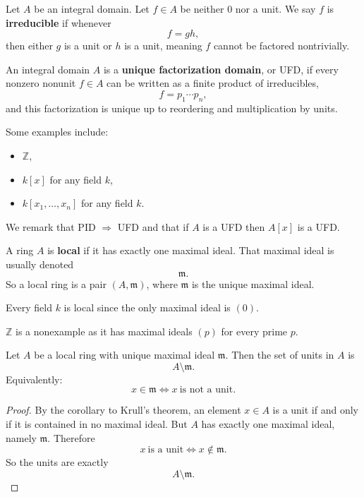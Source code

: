 \begin{defn}
    Let $A$ be an integral domain. Let $f \in A$ be neither 
    $0$ nor a unit. We say $f$ is \textbf{irreducible} 
    if whenever 
    \[
        f = gh, 
    \]
    then either $g$ is a unit or $h$ is a unit, 
    meaning $f$ cannot be factored nontrivially. 
\end{defn}
\begin{defn}[UFD]
    An integral domain $A$ is a \textbf{unique factorization domain},
    or UFD, if every nonzero nonunit $f \in A$ can be written as 
    a finite product of irreducibles, 
    \[
        f = p_1 \cdots p_n,
    \]
    and this factorization is unique up to reordering and  
    multiplication by units. 
\end{defn}
\begin{ex}
    Some examples include: 
    \begin{itemize}
        \item $\mathbb Z$, 
        \item $k[x]$ for any field $k$, 
        \item $k[x_1,\ldots,x_n]$ for any field $k$. 
    \end{itemize}
\end{ex}

We remark that PID $\Rightarrow$ UFD and that if 
$A$ is a UFD then $A[x]$ is a UFD. 

\begin{defn}
    A ring $A$ is \textbf{local} if it has exactly 
    one maximal ideal. 
    That maximal ideal is usually denoted 
    \[
        \mathfrak m. 
    \]
    So a local ring is a pair $(A, \mathfrak m)$, 
    where $\mathfrak m$ is the unique maximal ideal. 
\end{defn}

\begin{ex}
    Every field $k$ is local since the only maximal ideal 
    is $(0)$. 

    $\mathbb Z$ is a nonexample as it has maximal ideals 
    $(p)$ for every prime $p$. 
\end{ex}

\begin{prop}
    Let $A$ be a local ring with unique maximal ideal 
    $\mathfrak m$. Then the set of units in $A$ is 
    \[
        A \setminus \mathfrak m. 
    \]
    Equivalently: 
    \[
        x \in \mathfrak m 
        \Leftrightarrow x \ \text{is not a unit}. 
    \]
\end{prop}
\begin{proof}
    By the corollary to Krull's theorem, an element $x \in A$ 
    is a unit if and only if it is contained in no maximal ideal. 
    But $A$ has exactly one maximal ideal, namely 
    $\mathfrak m$. 
    Therefore 
    \[
        x \ \text{is a unit} \Leftrightarrow 
        x \not\in \mathfrak m. 
    \]
    So the units are exactly 
    \[
        A \setminus \mathfrak m. 
    \]
\end{proof}

